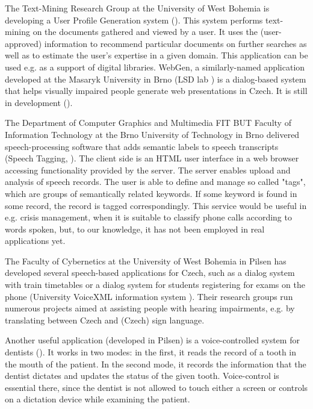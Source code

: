 \begin{multicols}{2}
The Text-Mining Research Group at the University of West Bohemia is developing a User Profile Generation system (\cite{Grolmus2003}). This system performs text-mining on the documents gathered and viewed by a user. It uses the (user-approved) information to recommend particular documents on further searches as well as to estimate the user’s expertise in a given domain. This application can be used e.g. as a support of digital libraries.
WebGen, a similarly-named application developed at the Masaryk University in Brno (LSD lab \cite{Note22}) is a dialog-based system that helps visually impaired people generate web presentations in Czech. It is still in development (\cite{BartelPlhak2008}).

The Department of Computer Graphics and Multimedia FIT BUT Faculty of Information Technology at the Brno University of Technology in Brno \cite{Note23} delivered speech-processing software that adds semantic labels to speech transcripts (Speech Tagging, \cite{Smrz2010}). The client side is an HTML user interface in a web browser accessing functionality provided by the server. The server enables upload and analysis of speech records. The user is able to define and manage so called "tags", which are groups of semantically related keywords. If some keyword is found in some record, the record is tagged correspondingly. This service would be useful in e.g. crisis management, when it is suitable to classify phone calls according to words spoken, but, to our knowledge, it has not been employed in real applications yet.

The Faculty of Cybernetics at the University of West Bohemia in Pilsen has developed several speech-based applications for Czech, such as a dialog system with train timetables or a dialog system for students registering for exams on the phone (University VoiceXML information system \cite{Note24}). Their research groups run numerous projects aimed at assisting people with hearing impairments, e.g. by translating between Czech and (Czech) sign language.

Another useful application (developed in Pilsen) is a voice-controlled system for dentists (\cite{Nagy2008}). It works in two modes:  in the first, it reads the record of a tooth in the mouth of the patient. In the second mode, it records the information that the dentist dictates and updates the status of the given tooth. Voice-control is essential there, since the dentist is not allowed to touch either a screen or controls on a dictation device while examining the patient.


\end{multicols}
